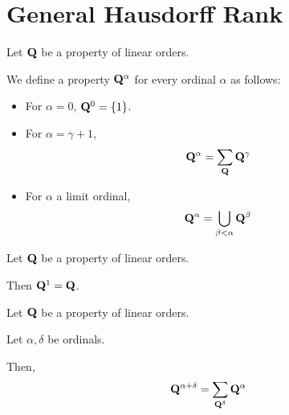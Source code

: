 
\section{General Hausdorff Rank}

\begin{definition}
  Let $\mathbf{Q}$ be a property of linear orders.

  We define a property $\mathbf{Q}^{\alpha}$
  for every ordinal $\alpha$ as follows:

  \begin{itemize}
    \item For $\alpha = 0$, $\mathbf{Q}^{0} = \left\{ {1} \right\}$.
    \item For $\alpha = \gamma + 1$,
          \[\mathbf{Q}^{\alpha} = \sum_{\mathbf{Q}}{\mathbf{Q}^{\gamma}}\]
    \item For $\alpha$ a limit ordinal,
          \[\mathbf{Q}^{\alpha} = \bigcup_{\beta < \alpha} \mathbf{Q}^{\beta}\]
  \end{itemize}
\end{definition}

\begin{example}
  Let $\mathbf{Q}$ be a property of linear orders.

  Then $\mathbf{Q}^{1} = \mathbf{Q}$.
\end{example}

\begin{lemma}\label{sum-of-ranks}
  Let $\mathbf{Q}$ be a property of linear orders.

  Let $\alpha, \delta$ be ordinals.

  Then,
  \[
    \mathbf{Q}^{\alpha + \delta}
    = \sum_{\mathbf{Q}^{\delta}}{\mathbf{Q}^{\alpha}}
  \]
\end{lemma}

